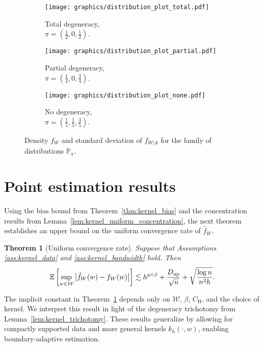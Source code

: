 \documentclass[11pt,lof]{puthesis}
\renewcommand{\P}{\ensuremath{\mathbb{P}}}
\newcommand{\E}{\ensuremath{\mathbb{E}}}
\newcommand{\rH}{\ensuremath{\mathrm{H}}}
\newcommand{\cW}{\ensuremath{\mathcal{W}}}
\newcommand{\Du}{\ensuremath{D_{\textup{up}}}}
\theoremstyle{break}
\newtheorem{theorem}{Theorem}[section]
\theoremstyle{proof}
\begin{document}
\begin{figure}[t]
  \centering
  \begin{subfigure}{0.32\textwidth}
    \centering
    \texttt{[image: graphics/distribution\_plot\_total.pdf]}
    \caption{Total degeneracy, \\
    $\pi = \left( \frac{1}{2}, 0, \frac{1}{2} \right)$.}
  \end{subfigure}
  \begin{subfigure}{0.32\textwidth}
    \centering
    \texttt{[image: graphics/distribution\_plot\_partial.pdf]}
    \caption{Partial degeneracy, \\
    $\pi = \left( \frac{1}{4}, 0, \frac{3}{4} \right)$.}
  \end{subfigure}
  \begin{subfigure}{0.32\textwidth}
    \centering
    \texttt{[image: graphics/distribution\_plot\_none.pdf]}
    \caption{No degeneracy, \\
    $\pi = \left( \frac{1}{5}, \frac{1}{5}, \frac{3}{5} \right)$.}
  \end{subfigure}
  \caption[The family of distributions $\P_\pi$]{
    Density $f_W$ and standard deviation
  of $f_{W|A}$ for the family of distributions $\P_\pi$.}
  \label{fig:kernel_distribution}
\end{figure}

\section{Point estimation results}
\label{sec:kernel_point_estimation}

Using the bias bound from Theorem~\ref{thm:kernel_bias} and
the concentration results from Lemma~\ref{lem:kernel_uniform_concentration},
the next theorem establishes an upper bound on the uniform convergence rate of
$\hat f_W$.
%
\begin{theorem}[Uniform convergence rate]%
  \label{thm:kernel_uniform_consistency}%
  Suppose that Assumptions \ref{ass:kernel_data} and
  \ref{ass:kernel_bandwidth} hold. Then
  \begin{align*}
    \E\left[
      \sup_{w \in \cW}
      \big|\hat{f}_W(w) - f_W(w)\big|
    \right]
    \lesssim
    h^{p\wedge\beta} + \frac{\Du}{\sqrt n} + \sqrt{\frac{\log n}{n^2h}}.
  \end{align*}
\end{theorem}
%
The implicit constant in Theorem~\ref{thm:kernel_uniform_consistency} depends
only on
$\cW$, $\beta$, $C_\rH$, and the choice of kernel. We interpret this result in
light of the degeneracy trichotomy from Lemma~\ref{lem:kernel_trichotomy}.
These results generalize \citet*[Theorem~1]{chiang2020empirical}
by allowing for compactly supported data and more general kernels
$k_h(\cdot,w)$, enabling boundary-adaptive estimation.
\end{document}
